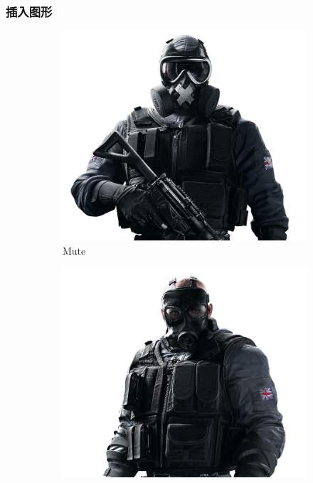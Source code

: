 \documentclass{ctexart}             %
\numberwithin{table}{section}
\numberwithin{figure}{section}
\begin{document}
\subsubsection{插入图形}
\zhlipsum[1]
\begin{figure}
    \centering
    \begin{subfigure}[b]{0.2\textwidth}
        \centering
        \includegraphics[width=\textwidth]{imgs/SAS-Mute.png}
        \caption{Mute}
        \label{fig:mute}
    \end{subfigure}
    \hfill
    \begin{subfigure}[b]{0.2\textwidth}
        \centering
        \includegraphics[width=\textwidth]{imgs/SAS-Sledge.png}

\end{subfigure}
\end{figure}
\end{document}
